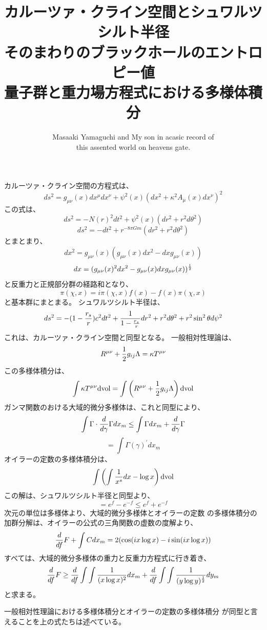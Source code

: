 \documentclass{jsarticle}
\begin{document}
\title{カルーツァ・クライン空間とシュワルツシルト半径 \\
そのまわりのブラックホールのエントロピー値 \\
量子群と重力場方程式における多様体積分}
\author{Masaaki Yamaguchi and My son in acasic record of \\
this assented world on heavens gate.}
\date{}
\maketitle

    カルーツァ・クライン空間の方程式は、
    $$ ds^2 = g_{\mu\nu}(x)dx^{\mu}dx^{\nu} + \psi^2(x)(dx^2 + \kappa^2
    A_{\mu}(x)dx^{\nu})^2 $$
    この式は、
    $$ ds^2 = -N(r)^2dt^2 + \psi^2(x)(dr^2 + r^2d\theta^2) $$
    $$ ds^2 = -dt^2 + r^{-8\pi Gm}(dr^2 + r^2d\theta^2) $$
    とまとまり、
    $$ dx^2 = g_{\mu\nu}(x)(g_{\mu\nu}(x)dx^2 - dxg_{\mu\nu}(x)) $$
    $$ dx = (g_{\mu\nu}(x)^2dx^2 - g_{\mu\nu}(x)dx g_{\mu\nu}(x))^{1 \over 2} $$
    と反重力と正規部分群の経路和となり、　
    $$ \pi(\chi, x) = i \pi (\chi, x)f(x) - f(x)  \pi (\chi, x) $$
    と基本群にまとまる。
    シュワルツシルト半径は、
    $$ ds^2 = -(1 - {r_s \over r})c^2 dt^2 + {1 \over {{1 - {r_s \over r}}}} 
    dr^2 + r^2 d \theta^2 + r^2 \sin^2 \theta d \psi^2 $$
    これは、カルーツァ・クライン空間と同型となる。
    一般相対性理論は、
    $$ R^{\mu\nu} + {1 \over 2}g_{ij}\Lambda = \kappa T^{\mu\nu} $$
    この多様体積分は、
    $$ \int \kappa T^{\mu\nu}\mathrm{dvol} = \int  \left(R^{\mu\nu} + 
    {1 \over 2}g_{ij}\Lambda\right)\mathrm{dvol}  $$
    ガンマ関数のおける大域的微分多様体は、これと同型により、
    $$ \int \Gamma \cdot {d \over {d \gamma}}{\Gamma dx_m} \le \int \Gamma
    dx_m + {d \over d \gamma}\Gamma $$
    $$ = \int \Gamma(\gamma)^{'}dx_m $$
    オイラーの定数の多様体積分は、
    $$ \int \left({{\int {1 \over x^s}}dx - \log x} \right)\mathrm{dvol} $$
    この解は、シュワルツシルト半径と同型より、
    $$ = e^f - e^{-f} \le {e^f + e^{-f}} $$
    次元の単位は多様体より、大域的微分多様体とオイラーの定数
    の多様体積分の加群分解は、オイラーの公式の三角関数の虚数の度解より、
    $$ {d \over df}F + \int C dx_m = 2 (\cos (i x \log x) 
    - i \sin (i x \log x)) $$
    すべては、大域的微分多様体の重力と反重力方程式に行き着き、
    $$ {d \over df}F \ge {d \over df}\int \int{1 \over (x \log x)^2}dx_m
    + {d \over df}\int \int{1 \over (y \log y)^{1 \over 2}}dy_m $$
    と求まる。

    一般相対性理論における多様体積分とオイラーの定数の多様体積分
    が同型と言えることを上の式たちは述べている。
\end{document}
